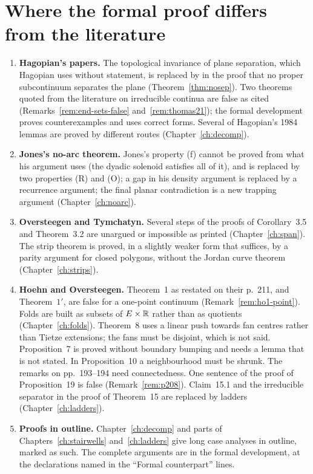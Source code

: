 \section{Where the formal proof differs from the literature}\label{sec:intro-diff}

\begin{enumerate}
\item \textbf{Hagopian's papers.} The topological invariance of plane separation, which Hagopian uses without statement, is replaced by  in the proof that no
proper subcontinuum separates the plane (Theorem~\ref{thm:nosep}). Two theorems quoted from the literature on irreducible continua are false as cited (Remarks~\ref{rem:end-sets-false} and~\ref{rem:thomas21});
the formal development proves counterexamples and uses correct forms. Several of Hagopian's 1984 lemmas are proved by different routes (Chapter~\ref{ch:decomp}).
\item \textbf{Jones's no-arc theorem.} Jones's property (f) cannot be proved from what his argument uses (the dyadic solenoid satisfies all of it), and is replaced by two
properties (R) and (O); a gap in his density argument is replaced by a recurrence argument; the final planar contradiction is a new trapping argument
(Chapter~\ref{ch:noarc}).
\item \textbf{Oversteegen and Tymchatyn.} Several steps of the proofs of Corollary~3.5 and Theorem~3.2 are unargued or impossible as printed (Chapter~\ref{ch:span}). The strip
theorem is proved, in a slightly weaker form that suffices, by a parity argument for closed polygons, without the Jordan curve theorem (Chapter~\ref{ch:strips}).
\item \textbf{Hoehn and Oversteegen.} Theorem~1 as restated on their p.~211, and Theorem~$1'$, are false for a one-point continuum (Remark~\ref{rem:ho1-point}). Folds are built
as subsets of $E\times\mathbb{R}$ rather than as quotients (Chapter~\ref{ch:folds}). Theorem~8 uses a linear push towards fan centres rather than Tietze extensions; the fans must
be disjoint, which is not said. Proposition~7 is proved without boundary bumping and needs a lemma that is not stated. In Proposition~10 a neighbourhood must be shrunk. The
remarks on pp.~193--194 need connectedness. One sentence of the proof of Proposition~19 is false (Remark~\ref{rem:p208}). Claim~15.1 and the irreducible separator in the proof of
Theorem~15 are replaced by ladders (Chapter~\ref{ch:ladders}).
\item \textbf{Proofs in outline.} Chapter~\ref{ch:decomp} and parts of Chapters~\ref{ch:stairwells} and~\ref{ch:ladders} give long case analyses in outline, marked as such. The complete
arguments are in the formal development, at the declarations named in the ``Formal counterpart'' lines.
\end{enumerate}

